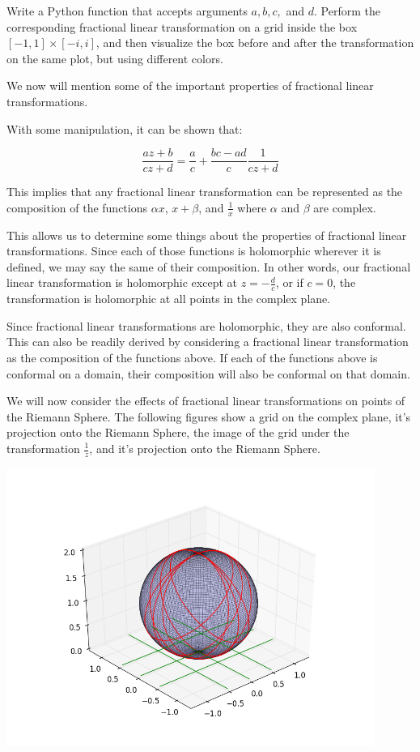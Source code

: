 \begin{problem} Write a Python function that accepts arguments $a,b,c,$ and $d$. Perform the corresponding fractional linear transformation on a grid inside the box $[-1,1]\times[-i,i]$, and then visualize the box before and after the transformation on the same plot, but using different colors.
\end{problem}

We now will mention some of the important properties of fractional linear transformations.

With some manipulation, it can be shown that:

$$\frac{az+b}{cz+d}=\frac{a}{c}+\frac{bc-ad}{c} \frac{1}{cz+d}$$

This implies that any fractional linear transformation can be represented as the composition of the functions $\alpha x$, $x+\beta$, and $\frac{1}{x}$ where $\alpha$ and $\beta$ are complex. 

This allows us to determine some things about the properties of fractional linear transformations. Since each of those functions is holomorphic wherever it is defined, we may say the same of their composition. In other words, our fractional linear transformation is holomorphic except at $z=-\frac{d}{c}$, or if $c=0$, the transformation is holomorphic at all points in the complex plane. 

Since fractional linear transformations are holomorphic, they are also conformal. This can also be readily derived by considering a fractional linear transformation as the composition of the functions above. If each of the functions above is conformal on a domain, their composition will also be conformal on that domain. 

We will now consider the effects of fractional linear transformations on points of the Riemann Sphere. The following figures show a grid on the complex plane, it's projection onto the Riemann Sphere, the image of the grid under the transformation $\frac{1}{z}$, and it's projection onto the Riemann Sphere. 

\includegraphics[width=120mm]{mobius2.png}

